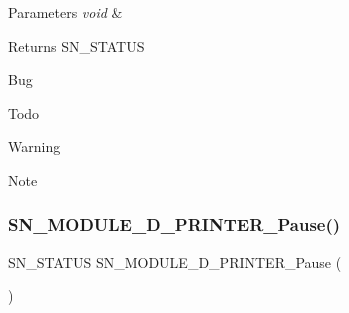 \begin{DoxyParams}{Parameters}
{\em void} & \\
\hline
\end{DoxyParams}
\begin{DoxyReturn}{Returns}
S\+N\+\_\+\+S\+T\+A\+T\+US 
\end{DoxyReturn}
\begin{DoxyRefDesc}{Bug}
\item[\hyperlink{bug__bug000008}{Bug}]\end{DoxyRefDesc}
\begin{DoxyRefDesc}{Todo}
\item[\hyperlink{todo__todo000008}{Todo}]\end{DoxyRefDesc}
\begin{DoxyWarning}{Warning}

\end{DoxyWarning}
\begin{DoxyNote}{Note}

\end{DoxyNote}
\mbox{\label{group__D_ga84a03238ddc0021011c12839757bf8c2}} 
\subsubsection{\texorpdfstring{S\+N\+\_\+\+M\+O\+D\+U\+L\+E\+\_\+D\+\_\+\+P\+R\+I\+N\+T\+E\+R\+\_\+\+Pause()}{SN\_MODULE\_3D\_PRINTER\_Pause()}}
{\footnotesize\ttfamily S\+N\+\_\+\+S\+T\+A\+T\+US S\+N\+\_\+\+M\+O\+D\+U\+L\+E\+\_\+D\+\_\+\+P\+R\+I\+N\+T\+E\+R\+\_\+\+Pause (\begin{DoxyParamCaption}\item[{void}]{ }\end{DoxyParamCaption})}



